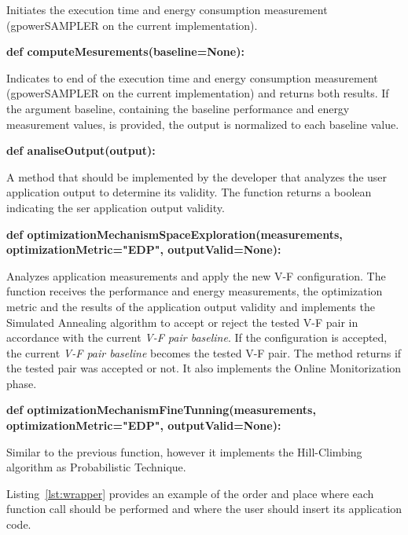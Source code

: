 Initiates the execution time and energy consumption measurement (gpowerSAMPLER on the current implementation).

\textbf{def computeMesurements(baseline=None):}

Indicates to end of the execution time and energy consumption measurement (gpowerSAMPLER on the current implementation) and returns both results. If the argument baseline, containing the baseline performance and energy measurement values, is provided, the output is normalized to each baseline value.


\textbf{def analiseOutput(output):}

A method that should be implemented by the developer that analyzes the user application output to determine its validity. The function returns a boolean indicating the ser application output validity.
    
\textbf{def optimizationMechanismSpaceExploration(measurements, optimizationMetric="EDP", outputValid=None):}

Analyzes application measurements and apply the new V-F configuration. The function receives the performance and energy measurements, the optimization metric and the results of the application output validity and implements the Simulated Annealing algorithm to accept or reject the tested V-F pair in accordance with the current \textit{V-F pair baseline}. If the configuration is accepted, the current \textit{V-F pair baseline} becomes the tested V-F pair. The method returns if the tested pair was accepted or not. It also implements the Online Monitorization phase.


\textbf{def optimizationMechanismFineTunning(measurements, optimizationMetric="EDP", outputValid=None):}

Similar to the previous function, however it implements the Hill-Climbing algorithm as Probabilistic Technique.


Listing~\ref{lst:wrapper} provides an example of the order and place where each function call should be performed and where the user should insert its application code.


